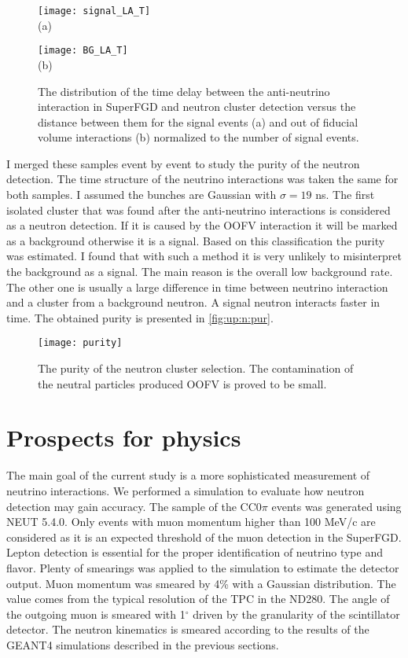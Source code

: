 \documentclass[main.tex]{subfiles}
\begin{document}
\begin{figure}[!ht]
  \centering
  \begin{minipage}{0.49\linewidth}
    \centering
    \texttt{[image: signal\_LA\_T]} \\ (a)
  \end{minipage}
  \begin{minipage}{0.49\linewidth}
    \centering
    \texttt{[image: BG\_LA\_T]} \\ (b)
  \end{minipage}
  \caption{The distribution of the time delay between the anti-neutrino interaction in SuperFGD and neutron cluster detection versus the distance between them for the signal events (a) and out of fiducial volume interactions (b) normalized to the number of signal events.}
  \label{fig:up:n:bg}
\end{figure}

I merged these samples event by event to study the purity of the neutron detection. The time structure of the neutrino interactions was taken the same for both samples. I assumed the bunches are Gaussian with $\sigma=19$ ns.  The first isolated cluster that was found after the anti-neutrino interactions is considered as a neutron detection. If it is caused by the OOFV interaction it will be marked as a background otherwise it is a signal. Based on this classification the purity was estimated. I found that with such a method it is very unlikely to misinterpret the background as a signal. The main reason is the overall low background rate. The other one is usually a large difference in time between neutrino interaction and a cluster from a background neutron. A signal neutron interacts faster in time. The obtained purity is presented in \autoref{fig:up:n:pur}.

\begin{figure}[!ht]
  \centering
  \texttt{[image: purity]}
  \caption{The purity of the neutron cluster selection. The contamination of the neutral particles produced OOFV is proved to be small.}
  \label{fig:up:n:pur}
\end{figure}


\section{Prospects for physics}
The main goal of the current study is a more sophisticated measurement of neutrino interactions. We performed a simulation to evaluate how neutron detection may gain accuracy. The sample of the CC0$\pi$ events was generated using NEUT 5.4.0. Only events with muon momentum higher than 100 MeV/c are considered as it is an expected threshold of the muon detection in the SuperFGD. Lepton detection is essential for the proper identification of neutrino type and flavor. Plenty of smearings was applied to the simulation to estimate the detector output. Muon momentum was smeared by 4\% with a Gaussian distribution. The value comes from the typical resolution of the TPC in the ND280. The angle of the outgoing muon is smeared with 1${}^\circ$ driven by the granularity of the scintillator detector. The neutron kinematics is smeared according to the results of the GEANT4 simulations described in the previous sections.
\end{document}
